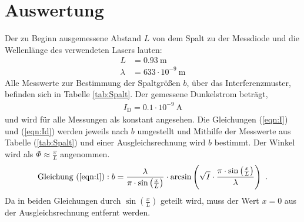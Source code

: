 \section{Auswertung}
\label{sec:Auswertung}

Der zu Beginn ausgemessene Abstand $L$ von dem Spalt zu der Messdiode und die Wellenlänge des verwendeten Lasers lauten:
\begin{align*}
  L &= 0.93 \ \text{m} \\
  \lambda &= 633 \cdot 10^{-9} \ \text{m}
\end{align*}
Alle Messwerte zur Bestimmung der Spaltgrößen $b$, über das Interferenzmuster, befinden sich in Tabelle \ref{tab:Spalt}. Der gemessene Dunkelstrom beträgt,
\begin{align*}
  I_\text{D} = 0.1 \cdot 10^{-9} \ \text{A}
\end{align*}
und wird für alle Messungen als konstant angesehen. Die Gleichungen (\ref{eqn:I}) und (\ref{eqn:Id}) werden jeweils nach $b$ umgestellt und Mithilfe der Messwerte aus Tabelle (\ref{tab:Spalt}) und einer Ausgleichsrechnung wird $b$ bestimmt. Der Winkel wird als $\Phi \approx \frac{x}{L}$ angenommen.
\begin{equation}
  \text{Gleichung (\ref{eqn:I})}: b = \frac{\lambda}{\pi \cdot \sin\left(\frac{x}{L}\right)} \cdot \arcsin\left(\sqrt{I} \cdot \frac{\pi \cdot \sin\left(\frac{x}{L}\right)}{\lambda}\right) \ .
\end{equation}
Da in beiden Gleichungen durch $\sin\left(\frac{x}{L} \right)$ geteilt wird, muss der Wert $x = 0$ aus der Ausgleichsrechnung entfernt werden.

